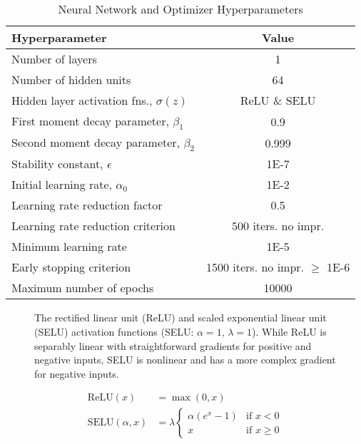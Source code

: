 \documentclass[conference,final]{IEEEtran}
\begin{document}
	\begin{table}[!t]
    \renewcommand{\arraystretch}{1.0}
    \centering
    \caption{Neural Network and Optimizer Hyperparameters}
    \label{tab:nn_hyperparams}
        \begin{tabular}{lc}
        \toprule 
        \bfseries Hyperparameter & \bfseries Value \\ \midrule
	    Number of layers & 1 \\
	    Number of hidden units & 64 \\ 
	    Hidden layer activation fns., $\sigma(z)$ & ReLU \& SELU \\
	    First moment decay parameter, $\beta_1$ & 0.9 \\
	    Second moment decay parameter, $\beta_2$ & 0.999 \\
	    Stability constant, $\epsilon$ & 1E-7 \\ 
	    Initial learning rate, $\alpha_0$ & 1E-2 \\ 
	    Learning rate reduction factor & 0.5 \\
	    Learning rate reduction criterion & 500 iters. no impr. \\
	    Minimum learning rate & 1E-5 \\
	    Early stopping criterion & 1500 iters. no impr. $\ge$ 1E-6 \\ 
	    Maximum number of epochs & 10000 \\ \bottomrule
	    \end{tabular}
	\end{table}
	
	\begin{figure}[htbp]
	    \centering
	    \vspace*{-1em}
	    
	    \vspace*{-2em}
	    \caption{The rectified linear unit (ReLU) and scaled exponential linear unit (SELU) activation functions (SELU: $\alpha = 1$, $\lambda =1$). While ReLU is separably linear with straightforward gradients for positive and negative inputs, SELU is nonlinear and has a more complex gradient for negative inputs.}
	    \label{fig:activ_fns}
	\end{figure}
	\vspace*{-1em}
	\begin{align}
	    \text{ReLU}(x) &= \max(0, x) \\
	    \text{SELU}(\alpha, x) &= \lambda 
	        \begin{cases}
                \alpha (e^x - 1) & \text{if $x < 0$} \\
                x & \text{if $x \ge 0$}
            \end{cases}   
	\end{align}
	
\end{document}
